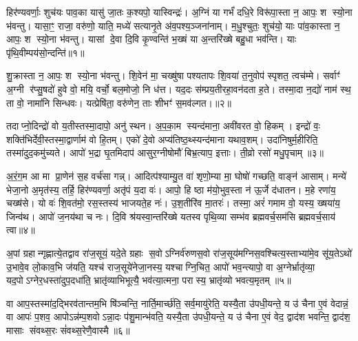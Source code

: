 \setcounter{anuvakam}{0}
हिर॑ण्यवर्णाः॒ शुच॑यः पाव॒का यासु॑ जा॒तः क॒श्यपो॒ यास्विन्द्रः॑। अ॒ग्निं या गर्भं॑ दधि॒रे विरू॑पा॒स्ता न॒ आपः॒ श स्यो॒ना भ॑वन्तु। यासा॒ꣳ॒ राजा॒ वरु॑णो॒ याति॒ मध्ये॑ सत्यानृ॒ते अ॑व॒पश्य॒ञ्जना॑नाम्। म॒धु॒श्चुतः॒ शुच॑यो॒ याः पा॑व॒कास्ता न॒ आपः॒ श स्यो॒ना भ॑वन्तु। यासां दे॒वा दि॒वि कृ॒ण्वन्ति॑ भ॒ख्षं या अ॒न्तरि॑ख्षे बहु॒धा भव॑न्ति। याः पृ॑थि॒वीम्पय॑सो॒न्दन्ति॑॥१॥

शु॒क्रास्ता न॒ आपः॒ श स्यो॒ना भ॑वन्तु। शि॒वेन॑ मा॒ चख्षु॑षा पश्यतापः शि॒वया॑ त॒नुवोप॑ स्पृशत॒ त्वच॑म्मे। सर्वाꣳ॑ अ॒ग्नी र॑प्सु॒षदो॑ हुवे वो॒ मयि॒ वर्चो॒ बल॒मोजो॒ नि ध॑त्त। यद॒दः स॑म्प्रय॒तीरहा॒वन॑दता ह॒ते। तस्मा॒दा न॒द्यो॑ नाम॑ स्थ॒ ता वो॒ नामा॑नि सिन्धवः। यत्प्रेषि॑ता॒ वरु॑णेन॒ ताः शीभꣳ॑ स॒मव॑ल्गत।॥२॥

तदाप्नो॒दिन्द्रो॑ वो य॒तीस्तस्मा॒दापो॒ अनु॑ स्थन। अ॒प॒का॒म स्यन्द॑माना॒ अवी॑वरत वो॒ हिकम्। इन्द्रो॑ वः॒ शक्ति॑भिर्देवी॒स्तस्मा॒द्वार्णाम॑ वो हि॒तम्। एको॑ दे॒वो अप्य॑तिष्ठ॒थ्स्यन्द॑माना यथाव॒शम्। उदा॑निषुर्म॒हीरिति॒ तस्मा॑दुद॒कमु॑च्यते। आपो॑ भ॒द्रा घृ॒तमिदाप॑ आसुर॒ग्नीषोमौ॑ बिभ्र॒त्याप॒ इत्ताः। ती॒व्रो रसो॑ मधु॒पृचाम्॥३॥

अ॒रं॒ग॒म आ मा प्रा॒णेन॑ स॒ह वर्च॑सा गन्न्। आदित्प॑श्याम्यु॒त वा॑ शृणो॒म्या मा॒ घोषो॑ गच्छति॒ वाङ्न॑ आसाम्। मन्ये॑ भेजा॒नो अ॒मृत॑स्य॒ तर्\mbox{}हि॒ हिर॑ण्यवर्णा॒ अतृ॑पं य॒दा वः॑। आपो॒ हि ष्ठा म॑यो॒भुव॒स्ता न॑ ऊ॒र्जे द॑धातन। म॒हे रणा॑य॒ चख्ष॑से। यो वः॑ शि॒वत॑मो॒ रस॒स्तस्य॑ भाजयते॒ह नः॑। उ॒श॒तीरि॑व मा॒तरः॑। तस्मा॒ अरं॑ गमाम वो॒ यस्य॒ ख्षया॑य॒ जिन्व॑थ। आपो॑ ज॒नय॑था च नः। दि॒वि श्र॑यस्वा॒न्तरि॑ख्षे यतस्व पृथि॒व्या सम्भ॑व ब्रह्मवर्च॒सम॑सि ब्रह्मवर्च॒साय॑ त्वा॥४॥

{\anuvakamend[{उ॒न्दन्ति॑ स॒मव॑ल्गत मधु॒पृचाम्मा॒तरो॒ द्वाविꣳ॑शतिश्च॥१॥}]}

अ॒पां ग्रहान्गृह्णात्ये॒तद्वाव रा॑ज॒सूयं॒ यदे॒ते ग्रहाः स॒वोऽग्निर्व॑रुणस॒वो रा॑ज॒सूय॑मग्निस॒वश्चित्य॒स्ताभ्या॑मे॒व सू॑य॒तेऽथो॑ उ॒भावे॒व लो॒काव॒भि ज॑यति॒ यश्च॑ राज॒सूये॑नेजा॒नस्य॒ यश्चाग्नि॒चित॒ आपो॑ भव॒न्त्यापो॒ वा अ॒ग्नेर्भ्रातृ॑व्या॒ यद॒पोऽग्नेर॒धस्ता॑दुप॒दधा॑ति॒ भ्रातृ॑व्याभिभूत्यै॒ भव॑त्या॒त्मना॒ परास्य॒ भ्रातृ॑व्यो भवत्य॒मृतम्॥५॥

वा आप॒स्तस्मा॑द॒द्भिरव॑तान्तम॒भि षि॑ञ्चन्ति॒ नार्ति॒मार्च्छ॑ति॒ सर्व॒मायु॑रेति॒ यस्यै॒ता उ॑पधी॒यन्ते॒ य उ॑ चैना ए॒वं वेदान्नं॒ वा आपः॑ प॒शव॒ आपोऽन्न॑म्प॒शवोऽन्ना॒दः प॑शु॒मान्भ॑वति॒ यस्यै॒ता उ॑पधी॒यन्ते॒ य उ॑ चैना ए॒वं वेद॒ द्वाद॑श भवन्ति॒ द्वाद॑श॒ मासाः संवथ्स॒रः सं॑वथ्स॒रेणै॒वास्मै॥६॥

